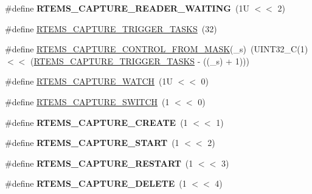\begin{DoxyCompactItemize}
\item 
\mbox{\label{group__libmisc__capture_ga8deee41a0dbfaf8c4129ef6f729a59ca}} 
\#define {\bfseries R\+T\+E\+M\+S\+\_\+\+C\+A\+P\+T\+U\+R\+E\+\_\+\+R\+E\+A\+D\+E\+R\+\_\+\+W\+A\+I\+T\+I\+NG}~(1\+U $<$$<$ 2)
\item 
\#define \mbox{\hyperlink{group__libmisc__capture_gabac5efd1e36645cb55fbe5fb5fff3ec5}{R\+T\+E\+M\+S\+\_\+\+C\+A\+P\+T\+U\+R\+E\+\_\+\+T\+R\+I\+G\+G\+E\+R\+\_\+\+T\+A\+S\+KS}}~(32)
\item 
\#define \mbox{\hyperlink{group__libmisc__capture_ga3242850119d87a75a136b05fbf9195ef}{R\+T\+E\+M\+S\+\_\+\+C\+A\+P\+T\+U\+R\+E\+\_\+\+C\+O\+N\+T\+R\+O\+L\+\_\+\+F\+R\+O\+M\+\_\+\+M\+A\+SK}}(\+\_\+s)~(U\+I\+N\+T32\+\_\+C(1) $<$$<$ (\mbox{\hyperlink{group__libmisc__capture_gabac5efd1e36645cb55fbe5fb5fff3ec5}{R\+T\+E\+M\+S\+\_\+\+C\+A\+P\+T\+U\+R\+E\+\_\+\+T\+R\+I\+G\+G\+E\+R\+\_\+\+T\+A\+S\+KS}} -\/ ((\+\_\+s) + 1)))
\item 
\#define \mbox{\hyperlink{group__libmisc__capture_gadeb9357a00fe3609d4e982e3b378d65a}{R\+T\+E\+M\+S\+\_\+\+C\+A\+P\+T\+U\+R\+E\+\_\+\+W\+A\+T\+CH}}~(1\+U $<$$<$ 0)
\item 
\#define \mbox{\hyperlink{group__libmisc__capture_ga6970f8b4c0a14fcd49b5083346b44a4e}{R\+T\+E\+M\+S\+\_\+\+C\+A\+P\+T\+U\+R\+E\+\_\+\+S\+W\+I\+T\+CH}}~(1 $<$$<$ 0)
\item 
\mbox{\label{group__libmisc__capture_gaa5a334ec5c100a0c377e63a37b44e421}} 
\#define {\bfseries R\+T\+E\+M\+S\+\_\+\+C\+A\+P\+T\+U\+R\+E\+\_\+\+C\+R\+E\+A\+TE}~(1 $<$$<$ 1)
\item 
\mbox{\label{group__libmisc__capture_ga7568b0c623a711569cd28dc1fcbafd14}} 
\#define {\bfseries R\+T\+E\+M\+S\+\_\+\+C\+A\+P\+T\+U\+R\+E\+\_\+\+S\+T\+A\+RT}~(1 $<$$<$ 2)
\item 
\mbox{\label{group__libmisc__capture_ga5f3d643b7244e1cca65782f814c1defc}} 
\#define {\bfseries R\+T\+E\+M\+S\+\_\+\+C\+A\+P\+T\+U\+R\+E\+\_\+\+R\+E\+S\+T\+A\+RT}~(1 $<$$<$ 3)
\item 
\mbox{\label{group__libmisc__capture_gad098bdde787e15061d7cdf1feb578a7e}} 
\#define {\bfseries R\+T\+E\+M\+S\+\_\+\+C\+A\+P\+T\+U\+R\+E\+\_\+\+D\+E\+L\+E\+TE}~(1 $<$$<$ 4)

\end{DoxyCompactItemize}
